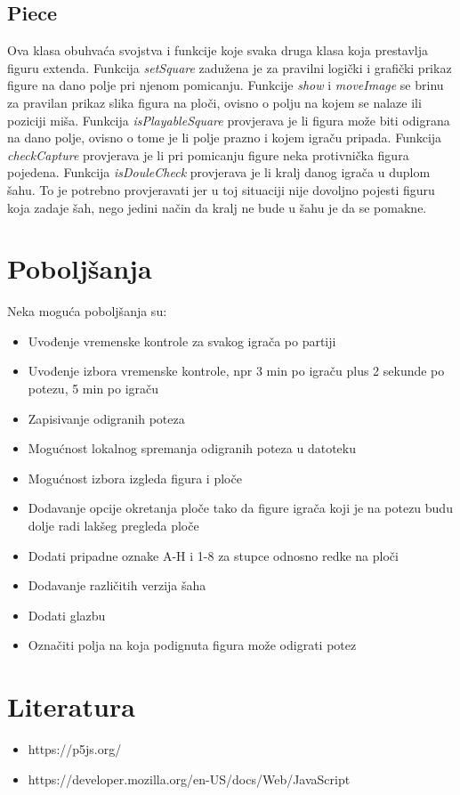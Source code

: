 \documentclass[11pt]{article}
\begin{document}
\subsection{Piece}
Ova klasa obuhvaća svojstva i funkcije koje svaka druga klasa koja prestavlja figuru extenda.
Funkcija \textit{setSquare} zadužena je za pravilni logički i grafički prikaz figure na dano polje pri njenom pomicanju. 
Funkcije \textit{show} i \textit{moveImage} se brinu za pravilan prikaz slika figura na ploči, ovisno o polju na kojem se nalaze ili poziciji miša.
Funkcija \textit{isPlayableSquare} provjerava je li figura može biti odigrana na dano polje, ovisno o tome je li polje prazno i kojem igraču pripada.
Funkcija \textit{checkCapture} provjerava je li pri pomicanju figure neka protivnička figura pojedena.
Funkcija \textit{isDouleCheck} provjerava je li kralj danog igrača u duplom šahu. To je potrebno provjeravati jer u toj situaciji nije dovoljno pojesti
figuru koja zadaje šah, nego jedini način da kralj ne bude u šahu je da se pomakne.

\section{Poboljšanja}
Neka moguća poboljšanja su:
\begin{itemize}
    \item Uvođenje vremenske kontrole za svakog igrača po partiji
    \item Uvođenje izbora vremenske kontrole, npr 3 min po igraču plus 2 sekunde po potezu, 5 min po igraču
    \item Zapisivanje odigranih poteza
    \item Mogućnost lokalnog spremanja odigranih poteza u datoteku
    \item Mogućnost izbora izgleda figura i ploče
    \item Dodavanje opcije okretanja ploče tako da figure igrača koji je na potezu budu dolje radi lakšeg pregleda ploče
    \item Dodati pripadne oznake A-H i 1-8 za stupce odnosno redke na ploči
    \item Dodavanje različitih verzija šaha
    \item Dodati glazbu
    \item Označiti polja na koja podignuta figura može odigrati potez
\end{itemize} 

\section{Literatura}
\begin{itemize}
    \item https://p5js.org/
    \item https://developer.mozilla.org/en-US/docs/Web/JavaScript
\end{itemize}
\end{document}
